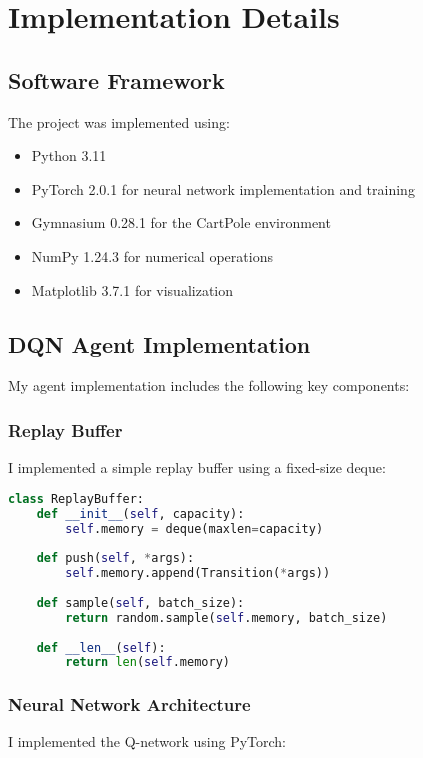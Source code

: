 \documentclass[11pt,a4paper]{article}
\begin{document}
\section{Implementation Details}

\subsection{Software Framework}

The project was implemented using:
\begin{itemize}
    \item Python 3.11
    \item PyTorch 2.0.1 for neural network implementation and training
    \item Gymnasium 0.28.1 for the CartPole environment
    \item NumPy 1.24.3 for numerical operations
    \item Matplotlib 3.7.1 for visualization
\end{itemize}

\subsection{DQN Agent Implementation}

My agent implementation includes the following key components:

\subsubsection{Replay Buffer}
I implemented a simple replay buffer using a fixed-size deque:

\begin{lstlisting}[language=Python, caption=Replay Buffer Implementation]
class ReplayBuffer:
    def __init__(self, capacity):
        self.memory = deque(maxlen=capacity)
    
    def push(self, *args):
        self.memory.append(Transition(*args))
    
    def sample(self, batch_size):
        return random.sample(self.memory, batch_size)
    
    def __len__(self):
        return len(self.memory)
\end{lstlisting}

\subsubsection{Neural Network Architecture}
I implemented the Q-network using PyTorch:
\end{document}
